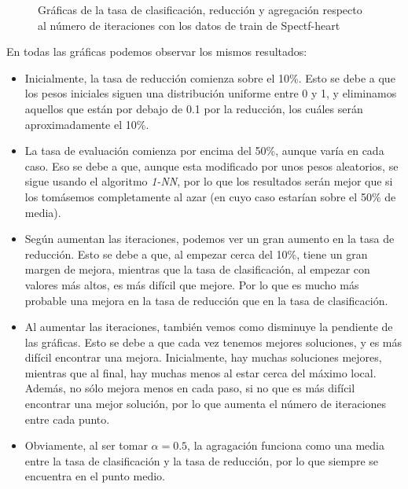 \documentclass[11pt,a4paper]{article}
\begin{document}
\begin{figure}[H]
	\caption{Gráficas de la tasa de clasificación, reducción y agregación respecto al número de iteraciones con los datos de train de Spectf-heart}
\end{figure}

En todas las gráficas podemos observar los mismos resultados:
\begin{itemize}
\item Inicialmente, la tasa de reducción comienza sobre el 10\%. Esto se debe a que los pesos iniciales siguen una distribución uniforme entre 0 y 1, y eliminamos aquellos que están por debajo de 0.1 por la reducción, los cuáles serán aproximadamente el 10\%.
\item La tasa de evaluación comienza por encima del 50\%, aunque varía en cada caso. Eso se debe a que, aunque esta modificado por unos pesos aleatorios, se sigue usando el algoritmo \emph{1-NN}, por lo que los resultados serán mejor que si los tomásemos completamente al azar (en cuyo caso estarían sobre el 50\% de media).
\item Según aumentan las iteraciones, podemos ver un gran aumento en la tasa de reducción. Esto se debe a que, al empezar cerca del 10\%, tiene un gran margen de mejora, mientras que la tasa de clasificación, al empezar con valores más altos, es más difícil que mejore. Por lo que es mucho más probable una mejora en la tasa de reducción que en la tasa de clasificación.
\item Al aumentar las iteraciones, también vemos como disminuye la pendiente de las gráficas. Esto se debe a que cada vez tenemos mejores soluciones, y es más difícil encontrar una mejora. Inicialmente, hay muchas soluciones mejores, mientras que al final, hay muchas menos al estar cerca del máximo local. Además, no sólo mejora menos en cada paso, si no que es más difícil encontrar una mejor solución, por lo que aumenta el número de iteraciones entre cada punto.
\item Obviamente, al ser tomar $\alpha = 0.5$, la agragación funciona como una media entre la tasa de clasificación y la tasa de reducción, por lo que siempre se encuentra en el punto medio.
\end{itemize}
\end{document}
